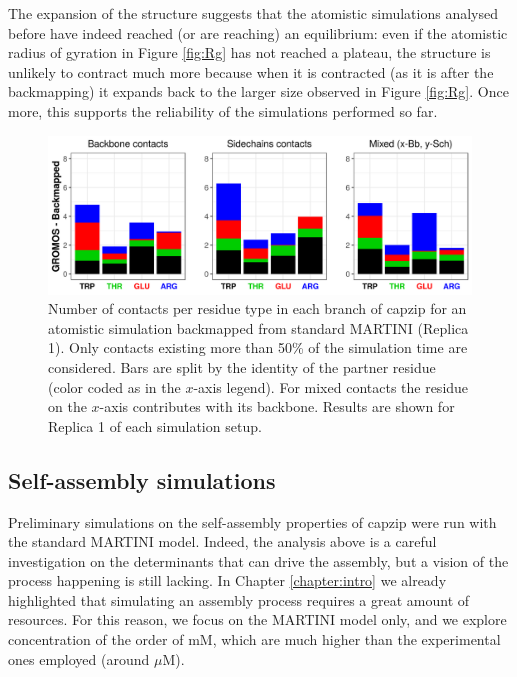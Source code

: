 The expansion of the structure suggests that the atomistic simulations analysed before have indeed reached (or are reaching) an equilibrium: even if the atomistic radius of gyration in Figure \ref{fig:Rg} has not reached a plateau, the structure is unlikely to contract much more because when it is contracted (as it is after the backmapping) it expands back to the larger size observed in Figure \ref{fig:Rg}.
Once more, this supports the reliability of the simulations performed so far.

\begin{figure}[t!]
\centering\includegraphics[width=0.95\linewidth]{3results_capsule/pics/contacts_BM.png} 
\caption[Backmapping simulations: contacts]{Number of contacts per residue type in each branch of capzip for an atomistic simulation backmapped from standard MARTINI (Replica 1). Only contacts existing more than 50\% of the simulation time are considered. Bars are split by the identity of the partner residue (color coded as in the $x$-axis legend). For mixed contacts the residue on the $x$-axis contributes with its backbone. Results are shown for Replica 1 of each simulation setup.}
\label{fig:BM_contacts}
\end{figure}

\subsection{Self-assembly simulations}
Preliminary simulations on the self-assembly properties of capzip were run with the standard MARTINI model. Indeed, the analysis above is a careful investigation on the determinants that can drive the assembly, but a vision of the process happening is still lacking.
%
In Chapter \ref{chapter:intro} we already highlighted that simulating an assembly process requires a great amount of resources. For this reason, we focus on the MARTINI model only, and we explore concentration of the order of mM, which are much higher than the experimental ones employed (around $\mu$M).

